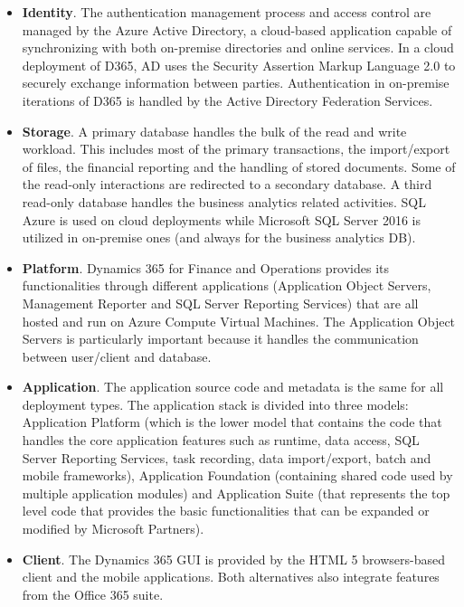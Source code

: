 \begin{itemize}
    \item \textbf{Identity}. The authentication management process and access control are managed by the Azure Active Directory, a cloud-based application capable of synchronizing with both on-premise directories and online services. In a cloud deployment of D365, AD uses the Security Assertion Markup Language 2.0 to securely exchange information between parties. Authentication in on-premise iterations of D365 is handled by the Active Directory Federation Services.
    
    \item \textbf{Storage}. A primary database handles the bulk of the read and write workload. This includes most of the primary transactions, the import/export of files, the financial reporting and the handling of stored documents. Some of the read-only interactions are redirected to a secondary database. A third read-only database handles the business analytics related activities. SQL Azure is used on cloud deployments while Microsoft SQL Server 2016 is utilized in on-premise ones (and always for the business analytics DB).
    
    \item \textbf{Platform}. Dynamics 365 for Finance and Operations provides its functionalities through different applications (Application Object Servers, Management Reporter and SQL Server Reporting Services) that are all hosted and run on Azure Compute Virtual Machines. The Application Object Servers is particularly important because it handles the communication between user/client and database.
    
    \item \textbf{Application}. The application source code and metadata is the same for all deployment types. The application stack is divided into three models: Application Platform (which is the lower model that contains the code that handles the core application features such as runtime, data access, SQL Server Reporting Services, task recording, data import/export, batch and mobile frameworks), Application Foundation (containing shared code used by multiple application modules) and Application Suite (that represents the top level code that provides the basic functionalities that can be expanded or modified by Microsoft Partners).
        
    \item \textbf{Client}. The Dynamics 365 GUI is provided by the HTML 5 browsers-based client and the mobile applications. Both alternatives also integrate features from the Office 365 suite.
    

\end{itemize}
